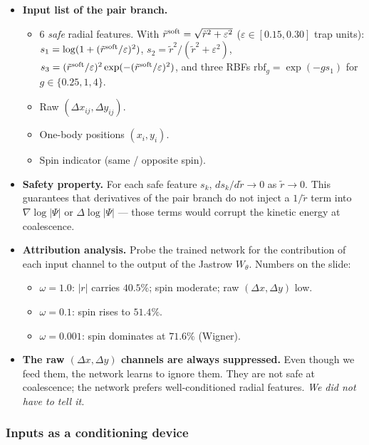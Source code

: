 \documentclass[11pt]{article}
\begin{document}
\begin{itemize}
\item \textbf{Input list of the pair branch.}
\begin{itemize}
\item 6 \emph{safe} radial features. With $\tilde r^{\rm soft} = \sqrt{\tilde
    r^2 + \varepsilon^2}$ ($\varepsilon \in [0.15, 0.30]$ trap units):
$s_1 = \log(1 + (\tilde r^{\rm soft}/\varepsilon)^2)$,
$s_2 = \tilde r^2 / (\tilde r^2 + \varepsilon^2)$,
$s_3 = (\tilde r^{\rm soft}/\varepsilon)^2 \exp(-(\tilde r^{\rm
    soft}/\varepsilon)^2)$, and three RBFs $\text{rbf}_g = \exp(-g s_1)$
for $g \in \{0.25, 1, 4\}$.
\item Raw $(\Delta x_{ij}, \Delta y_{ij})$.
\item One-body positions $(x_i, y_i)$.
\item Spin indicator (same / opposite spin).
\end{itemize}
\item \textbf{Safety property.} For each safe feature $s_k$, $ds_k / d\tilde r \to
  0$ as $\tilde r \to 0$. This guarantees that derivatives of the pair
branch do not inject a $1/\tilde r$ term into $\nabla \log|\Psi|$ or
$\Delta \log|\Psi|$ --- those terms would corrupt the kinetic energy at
coalescence.
\item \textbf{Attribution analysis.} Probe the trained network for the contribution
of each input channel to the output of the Jastrow $W_\theta$. Numbers
on the slide:
\begin{itemize}
\item $\omega = 1.0$: $|r|$ carries $40.5\%$; spin moderate; raw $(\Delta x,
    \Delta y)$ low.
\item $\omega = 0.1$: spin rises to $51.4\%$.
\item $\omega = 0.001$: spin dominates at $71.6\%$ (Wigner).
\end{itemize}
\item \textbf{The raw $(\Delta x, \Delta y)$ channels are always suppressed.} Even
though we feed them, the network learns to ignore them. They are not
safe at coalescence; the network prefers well-conditioned radial
features. \emph{We did not have to tell it.}
\end{itemize}
\subsubsection*{Inputs as a conditioning device}
\end{document}

